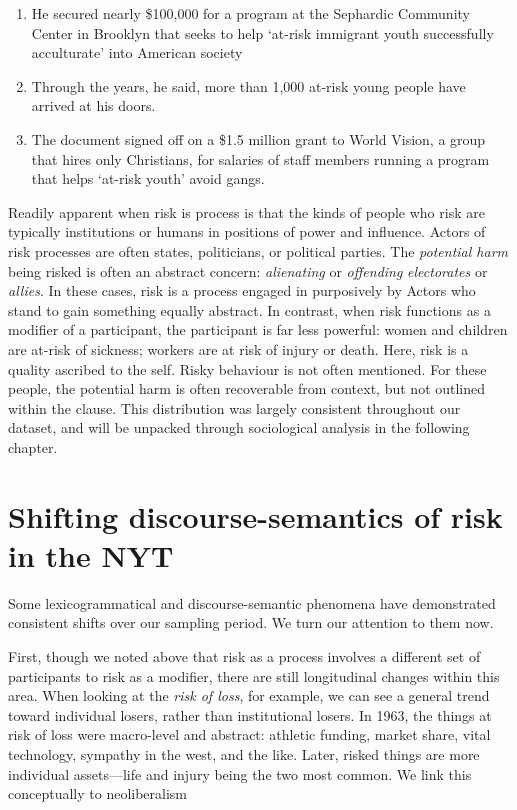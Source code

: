 \begin{enumerate}    [before=\itshape,font=\normalfont] \setlength\itemsep{0em} \small
    \item He secured nearly \$100,000 for a program at the Sephardic Community Center in Brooklyn that seeks to help `at-risk immigrant youth successfully acculturate' into American society
    \item Through the years, he said, more than 1,000 at-risk young people have arrived at his doors.
    \item The document signed off on a \$1.5 million grant to World Vision, a group that hires only Christians, for salaries of staff members running a program that helps `at-risk youth' avoid gangs.
\end{enumerate}
%
Readily apparent when risk is process is that the kinds of people who risk are typically institutions or humans in positions of power and influence. Actors of risk processes are often states, politicians, or political parties. The \emph{potential harm} being risked is often an abstract concern: \emph{alienating} or \emph{offending} \emph{electorates} or \emph{allies}. In these cases, risk is a process engaged in purposively by Actors who stand to gain something equally abstract. In contrast, when risk functions as a modifier of a participant, the participant is far less powerful: women and children are at-risk of sickness; workers are at risk of injury or death. Here, risk is a quality ascribed to the self. Risky behaviour is not often mentioned. For these people, the potential harm is often recoverable from context, but not outlined within the clause. This distribution was largely consistent throughout our dataset, and will be unpacked through sociological analysis in the following chapter. %

\section{Shifting discourse-semantics of risk in the NYT}

    Some lexicogrammatical and discourse-semantic phenomena have demonstrated consistent shifts over our sampling period. We turn our attention to them now.

    First, though we noted above that risk as a process involves a different set of participants to risk as a modifier, there are still longitudinal changes within this area. When looking at the \emph{risk of loss}, for example, we can see a general trend toward individual losers, rather than institutional losers. In 1963, the things at risk of loss were macro-level and abstract: athletic funding, market share, vital technology, sympathy in the west, and the like. Later, risked things are more individual assets---life and injury being the two most common. We link this conceptually to neoliberalism
    
